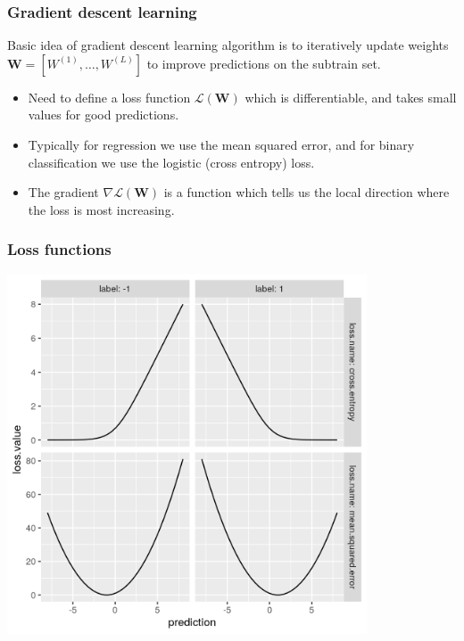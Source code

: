 \documentclass{beamer}
\begin{document}
\begin{frame}
  \frametitle{Gradient descent learning}
  Basic idea of gradient descent learning algorithm is to iteratively
  update weights $\mathbf W = [W^{(1)}, \dots, W^{(L)} ]$ to improve
  predictions on the subtrain set.
  \begin{itemize}
  \item Need to define a loss function
    $\mathcal L(\mathbf W)$ which is differentiable, and
    takes small values for good predictions.
  \item Typically for regression we use the mean squared error, and
    for binary classification we use the logistic (cross entropy)
    loss.
  \item The gradient $\nabla \mathcal L(\mathbf W)$ is a
    function which tells us the local direction where the loss is most
    increasing.
  \end{itemize}
\end{frame}

\begin{frame}
  \frametitle{Loss functions}
  \includegraphics[width=0.8\textwidth]{figure-loss} 
\end{frame}
\end{document}
